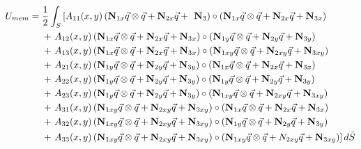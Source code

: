 \documentclass[journal]{new-aiaa}
\begin{document}
\begin{align}
		{U}_{mem}={}&  \frac{1}{2}\int_{S}\left[A_{11}(x,y) \left(\mathbf{N}_{1x}\vec{q} \otimes \vec{q} + \textbf{N}_{2x}\vec{q} +\textbf{ N}_{3}\right)\circ \left(\textbf{N}_{1x}\vec{q} \otimes \vec{q} + \textbf{N}_{2x}\vec{q} + \textbf{N}_{3x}\right)  \right. \notag\\ &+ \left. A_{12}(x,y) \left(\textbf{N}_{1x}\vec{q} \otimes \vec{q} + \textbf{N}_{2x}\vec{q} + \textbf{N}_{3x}\right)\circ \left(\textbf{N}_{1y}\vec{q} \otimes \vec{q} + \textbf{N}_{2y}\vec{q} + \textbf{N}_{3y}\right)  \right. \notag\\ &+ \left. A_{13}(x,y) \left(\textbf{N}_{1x}\vec{q} \otimes \vec{q} + \textbf{N}_{2x}\vec{q} + \textbf{N}_{3x}\right)\circ \left(\textbf{N}_{1xy}\vec{q} \otimes \vec{q} + \textbf{N}_{2xy}\vec{q} + \textbf{N}_{3xy}\right)  \right. \notag\\ &+ \left. A_{21}(x,y) \left(\textbf{N}_{1y}\vec{q} \otimes \vec{q} + \textbf{N}_{2y}\vec{q} + \textbf{N}_{3y}\right)\circ \left(\textbf{N}_{1x}\vec{q} \otimes \vec{q} + \textbf{N}_{2x}\vec{q} + \textbf{N}_{3x}\right)  \right. \notag\\ &+ \left. A_{22}(x,y) \left(\textbf{N}_{1y}\vec{q} \otimes \vec{q} + \textbf{N}_{2y}\vec{q} + \textbf{N}_{3y}\right)\circ \left(\textbf{N}_{1y}\vec{q} \otimes \vec{q} + \textbf{N}_{2y}\vec{q} + \textbf{N}_{3y}\right)  \right. \notag\\ &+ \left. A_{23}(x,y) \left(\textbf{N}_{1y}\vec{q} \otimes \vec{q} + \textbf{N}_{2y}\vec{q} + \textbf{N}_{3y}\right)\circ \left(\textbf{N}_{1xy}\vec{q} \otimes \vec{q} + \textbf{N}_{2xy}\vec{q} + \textbf{N}_{3xy}\right)  \right. \notag\\ &+ \left. A_{31}(x,y) \left(\textbf{N}_{1xy}\vec{q} \otimes \vec{q} + \textbf{N}_{2xy}\vec{q} + \textbf{N}_{3xy}\right)\circ \left(\textbf{N}_{1x}\vec{q} \otimes \vec{q} + \textbf{N}_{2x}\vec{q} + \textbf{N}_{3x}\right) \right. \notag\\ &+ \left. A_{32}(x,y) \left(\textbf{N}_{1xy}\vec{q} \otimes \vec{q} + \textbf{N}_{2xy}\vec{q} + \textbf{N}_{3xy}\right)\circ \left(\textbf{N}_{1y}\vec{q} \otimes \vec{q} + \textbf{N}_{2y}\vec{q} + \textbf{N}_{3y}\right) \right. \notag\\ &+ \left. A_{33}(x,y) \left(\textbf{N}_{1xy}\vec{q} \otimes \vec{q} + \textbf{N}_{2xy}\vec{q} + \textbf{N}_{3xy}\right)\circ \left(\textbf{N}_{1xy}\vec{q} \otimes \vec{q} + N_{2xy}\vec{q} + \textbf{N}_{3xy}\right)\right]d\bar{S}
		\label{eq:memDQM}
\end{align}
%
\end{document}

